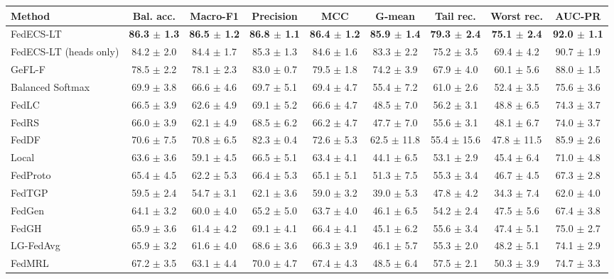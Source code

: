 \begin{tabular}{lcccccccc}
\toprule
Method & Bal. acc. & Macro-F1 & Precision & MCC & G-mean & Tail rec. & Worst rec. & AUC-PR\\
\midrule
FedECS-LT & \textbf{86.3 $\pm$ 1.3} & \textbf{86.5 $\pm$ 1.2} & \textbf{86.8 $\pm$ 1.1} & \textbf{86.4 $\pm$ 1.2} & \textbf{85.9 $\pm$ 1.4} & \textbf{79.3 $\pm$ 2.4} & \textbf{75.1 $\pm$ 2.4} & \textbf{92.0 $\pm$ 1.1}\\
FedECS-LT (heads only) & 84.2 $\pm$ 2.0 & 84.4 $\pm$ 1.7 & 85.3 $\pm$ 1.3 & 84.6 $\pm$ 1.6 & 83.3 $\pm$ 2.2 & 75.2 $\pm$ 3.5 & 69.4 $\pm$ 4.2 & 90.7 $\pm$ 1.9\\
GeFL-F & 78.5 $\pm$ 2.2 & 78.1 $\pm$ 2.3 & 83.0 $\pm$ 0.7 & 79.5 $\pm$ 1.8 & 74.2 $\pm$ 3.9 & 67.9 $\pm$ 4.0 & 60.1 $\pm$ 5.6 & 88.0 $\pm$ 1.5\\
Balanced Softmax & 69.9 $\pm$ 3.8 & 66.6 $\pm$ 4.6 & 69.7 $\pm$ 5.1 & 69.4 $\pm$ 4.7 & 55.4 $\pm$ 7.2 & 61.0 $\pm$ 2.6 & 52.4 $\pm$ 3.5 & 75.6 $\pm$ 3.6\\
FedLC & 66.5 $\pm$ 3.9 & 62.6 $\pm$ 4.9 & 69.1 $\pm$ 5.2 & 66.6 $\pm$ 4.7 & 48.5 $\pm$ 7.0 & 56.2 $\pm$ 3.1 & 48.8 $\pm$ 6.5 & 74.3 $\pm$ 3.7\\
FedRS & 66.0 $\pm$ 3.9 & 62.1 $\pm$ 4.9 & 68.5 $\pm$ 6.2 & 66.2 $\pm$ 4.7 & 47.7 $\pm$ 7.0 & 55.6 $\pm$ 3.1 & 48.1 $\pm$ 6.7 & 74.0 $\pm$ 3.7\\
FedDF & 70.6 $\pm$ 7.5 & 70.8 $\pm$ 6.5 & 82.3 $\pm$ 0.4 & 72.6 $\pm$ 5.3 & 62.5 $\pm$ 11.8 & 55.4 $\pm$ 15.6 & 47.8 $\pm$ 11.5 & 85.9 $\pm$ 2.6\\
Local & 63.6 $\pm$ 3.6 & 59.1 $\pm$ 4.5 & 66.5 $\pm$ 5.1 & 63.4 $\pm$ 4.1 & 44.1 $\pm$ 6.5 & 53.1 $\pm$ 2.9 & 45.4 $\pm$ 6.4 & 71.0 $\pm$ 4.8\\
FedProto & 65.4 $\pm$ 4.5 & 62.2 $\pm$ 5.3 & 66.4 $\pm$ 5.3 & 65.1 $\pm$ 5.1 & 51.3 $\pm$ 7.5 & 55.3 $\pm$ 3.4 & 46.7 $\pm$ 4.5 & 67.3 $\pm$ 2.8\\
FedTGP & 59.5 $\pm$ 2.4 & 54.7 $\pm$ 3.1 & 62.1 $\pm$ 3.6 & 59.0 $\pm$ 3.2 & 39.0 $\pm$ 5.3 & 47.8 $\pm$ 4.2 & 34.3 $\pm$ 7.4 & 62.0 $\pm$ 4.0\\
FedGen & 64.1 $\pm$ 3.2 & 60.0 $\pm$ 4.0 & 65.2 $\pm$ 5.0 & 63.7 $\pm$ 4.0 & 46.1 $\pm$ 6.5 & 54.2 $\pm$ 2.4 & 47.5 $\pm$ 5.6 & 67.4 $\pm$ 3.8\\
FedGH & 65.9 $\pm$ 3.6 & 61.4 $\pm$ 4.2 & 69.1 $\pm$ 4.1 & 66.4 $\pm$ 4.1 & 45.1 $\pm$ 6.2 & 55.6 $\pm$ 3.4 & 47.4 $\pm$ 5.1 & 75.0 $\pm$ 2.7\\
LG-FedAvg & 65.9 $\pm$ 3.2 & 61.6 $\pm$ 4.0 & 68.6 $\pm$ 3.6 & 66.3 $\pm$ 3.9 & 46.1 $\pm$ 5.7 & 55.3 $\pm$ 2.0 & 48.2 $\pm$ 5.1 & 74.1 $\pm$ 2.9\\
FedMRL & 67.2 $\pm$ 3.5 & 63.1 $\pm$ 4.4 & 70.0 $\pm$ 4.7 & 67.4 $\pm$ 4.3 & 48.5 $\pm$ 6.4 & 57.5 $\pm$ 2.1 & 50.3 $\pm$ 3.9 & 74.7 $\pm$ 3.3\\
\bottomrule
\end{tabular}
